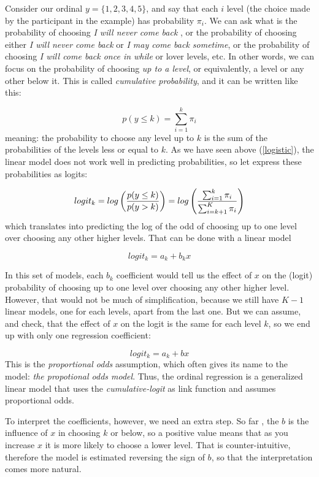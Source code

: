 \documentclass[
]{book}
\begin{document}
Consider our ordinal \(y=\{1,2,3,4,5\}\), and say that each \(i\) level (the choice made by the participant in the example) has probability \(\pi_i\). We can ask what is the probability of choosing \emph{I will never come back }, or the probability of choosing either \emph{I will never come back} or \emph{I may come back sometime}, or the probability of choosing \emph{I will come back once in while} or lover levels, etc. In other words, we can focus on the probability of choosing \emph{up to a level}, or equivalently, a level or any other below it. This is called \emph{cumulative probability}, and it can be written like this:

\[
p(y\le k)=\sum_{i=1}^k \pi_i
\]
meaning: the probability to choose any level up to \(k\) is the sum of the probabilities of the levels less or equal to \(k\). As we have seen above (\ref{logistic}), the linear model does not work well in predicting probabilities, so let express these probabilities as logits:

\[
logit_k=log \left( {p(y\le k) \over p(y > k)}\right)=log \left({\sum_{i=1}^k \pi_i \over \sum_{i=k+1}^K \pi_i} \right)
\]
which translates into predicting the log of the odd of choosing up to one level over choosing any other higher levels. That can be done with a linear model

\[
logit_k=a_k+b_k x
\]

In this set of models, each \(b_k\) coefficient would tell us the effect of \(x\) on the (logit) probability of choosing up to one level over choosing any other higher level. However, that would not be much of simplification, because we still have \(K-1\) linear models, one for each levels, apart from the last one. But we can assume, and check, that the effect of \(x\) on the logit is the same for each level \(k\), so we end up with only one regression coefficient:

\[
logit_k=a_k+b x
\]
This is the \emph{proportional odds} assumption, which often gives its name to the model: \emph{the propotional odds model}. Thus, the ordinal regression is a generalized linear model that uses the \emph{cumulative-logit} as link function and assumes proportional odds.

To interpret the coefficients, however, we need an extra step. So far , the \(b\) is the influence of \(x\) in choosing \(k\) or below, so a positive value means that as you increase \(x\) it is more likely to choose a lower level. That is counter-intuitive, therefore the model is estimated reversing the sign of \(b\), so that the interpretation comes more natural.
\end{document}
